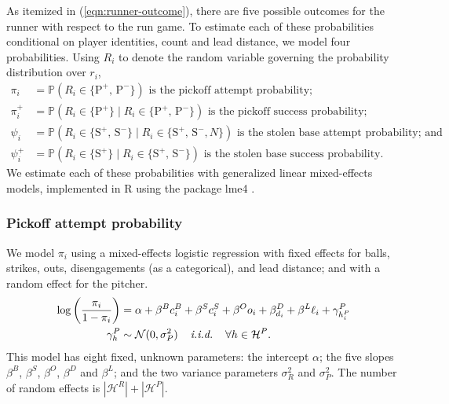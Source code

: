 \documentclass{article}
\begin{document}
      As itemized in (\ref{eqn:runner-outcome}), there are five possible outcomes for the runner with respect to the run game. To estimate each of these probabilities conditional on player identities, count and lead distance, we model four probabilities. Using $R_i$ to denote the random variable governing the probability distribution over $r_i$,
      \begin{align*}
        \pi_i    &= \mathbb{P}(R_i \in \{\mbox{P}^+,\, \mbox{P}^-\}) \mbox{ is the pickoff attempt probability;}\\
        \pi_i^+  &= \mathbb{P}(R_i \in \{\mbox{P}^+\} \mid R_i \in \{\mbox{P}^+,\, \mbox{P}^-\}) \mbox{ is the pickoff success probability;}\\
        \psi_i   &= \mathbb{P}(R_i \in \{\mbox{S}^+,\, \mbox{S}^-\} \mid R_i \in \{\mbox{S}^+,\, \mbox{S}^-, N\}) \mbox{ is the stolen base attempt probability; and}\\
        \psi_i^+ &= \mathbb{P}(R_i \in \{\mbox{S}^+\} \mid R_i \in \{\mbox{S}^+,\, \mbox{S}^-\}) \mbox{ is the stolen base success probability.}
      \end{align*}
      We estimate each of these probabilities with generalized linear mixed-effects models, implemented in R using the package lme4 \citep{bates_fitting_2015}.

      \subsubsection{Pickoff attempt probability}
      \label{sec:prob-po-attempt}

        We model $\pi_i$ using a mixed-effects logistic regression with fixed effects for balls, strikes, outs, disengagements (as a categorical), and lead distance; and with a random effect for the pitcher.
        \begin{align}
          \label{eqn:prob-po-attempt}
          \begin{split}
            \log\left(\frac{\pi_i}{1 - \pi_i}\right) &= \alpha + \beta^B c_i^B + \beta^S c_i^S + \beta^O o_i + \beta^D_{d_i} + \beta^L \ell_i + \gamma^P_{h_i^P}\\
            \gamma^P_{h} &\sim \mathcal{N}(0, \sigma^2_P) \hspace{4mm} \mbox{\it i.i.d.} \hspace{4mm} \forall h \in \mathcal{H}^P.
          \end{split}
        \end{align}
        This model has eight fixed, unknown parameters: the intercept $\alpha$; the five slopes $\beta^B$, $\beta^S$, $\beta^O$, $\beta^D$ and $\beta^L$; and the two variance parameters $\sigma^2_R$ and $\sigma^2_P$. The number of random effects is $|\mathcal{H}^R| + |\mathcal{H}^P|$.
        
\end{document}
